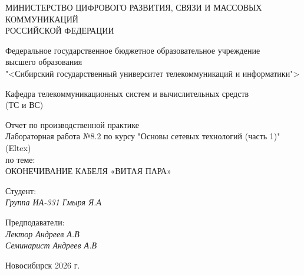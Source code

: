 \thispagestyle{empty}

\begin{center}
    МИНИСТЕРСТВО ЦИФРОВОГО РАЗВИТИЯ, СВЯЗИ И МАССОВЫХ КОММУНИКАЦИЙ \\ РОССИЙСКОЙ ФЕДЕРАЦИИ

    \vspace{20pt}

    Федеральное государственное бюджетное образовательное учреждение  \\  высшего образования \\
    "<Сибирский государственный университет телекоммуникаций и информатики"> \\

    \vspace{20pt}

    Кафедра телекоммуникационных систем и вычислительных средств \\  (ТС и ВС)
\end{center}

\vfill

\begin{center}
    Отчет по производственной практике \\  
    Лабораторная работа №8.2 по курсу "Основы сетевых технологий (часть 1)" (Eltex) \\
    \vspace{20pt}
    по теме: \\
    \uppercase{Оконечивание кабеля «витая пара»}
\end{center}

\vfill

    \noindent Студент: \\
    \textit{Группа ИА-331 \hfill Гмыря Я.А} 

    \vspace{20pt}
 
    \noindent Предподаватели: \\
    \textit{Лектор \hfill Андреев А.В} \\
    \textit{Семинарист \hfill Андреев А.В}

\vfill

\begin{center}
    Новосибирск 2026 г.
\end{center}
